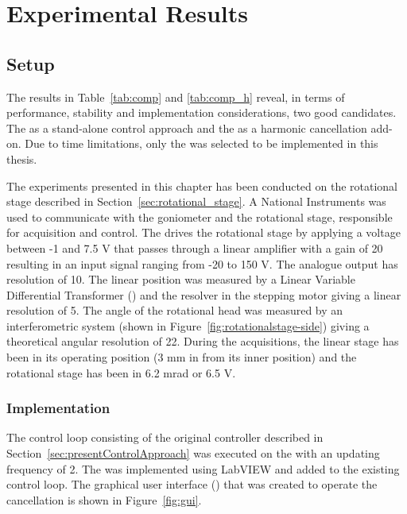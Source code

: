 \chapter{Experimental Results}\label{cha:exp_result}
\section{Setup}\label{sec:setup}
The results in Table~\ref{tab:comp} and \ref{tab:comp_h} reveal, in terms of performance, stability and implementation considerations, two good candidates. The \abbrIRC as a stand-alone control approach and the \abbrRFDC as a harmonic cancellation add-on. Due to time limitations, only the \abbrRFDC was selected to be implemented in this thesis.

The experiments presented in this chapter has been conducted on the rotational stage described in Section~\ref{sec:rotational_stage}. A National Instruments \abbrPXI was used to communicate with the goniometer and the rotational stage, responsible for acquisition and control. The \abbrPXI drives the rotational stage by applying a voltage between -1 and 7.5 V that passes through a linear amplifier with a gain of 20 resulting in an input signal ranging from -20 to 150 V. The analogue output has resolution of \unit{10}{\micro\volt}. The linear position was measured by a Linear Variable Differential Transformer (\abbrLVDT) and the resolver in the stepping motor giving a linear resolution of \unit{5}{\micro\meter}. The angle of the rotational head was measured by an interferometric system (shown in Figure~\ref{fig:rotationalstage-side}) giving a theoretical angular resolution of \unit{22}{\pico\radian}. During the acquisitions, the linear stage has been in its operating position (3 mm in from its inner position) and the rotational stage has been in 6.2 mrad or 6.5 V.

\subsection{Implementation}
The control loop consisting of the original controller described in Section~\ref{sec:presentControlApproach} was executed on the \abbrPXI with an updating frequency of \unit{2}{\kilo\hertz}. The \abbrRFDC was implemented using LabVIEW and added to the existing control loop. The graphical user interface (\abbrGUI) that was created to operate the cancellation is shown in Figure~\ref{fig:gui}.

